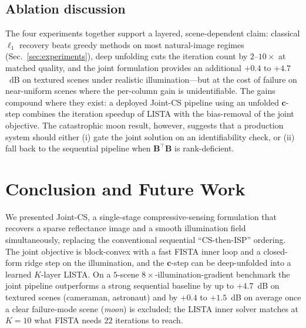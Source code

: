 \documentclass{article}
\begin{document}
\subsection{Ablation discussion}

The four experiments together support a layered, scene-dependent claim: classical $\ell_1$ recovery beats greedy methods on most natural-image regimes (Sec.~\ref{sec:experiments}), deep unfolding cuts the iteration count by $2$--$10\times$ at matched quality, and the joint formulation provides an additional $+0.4$ to $+4.7$~dB on textured scenes under realistic illumination---but at the cost of failure on near-uniform scenes where the per-column gain is unidentifiable. The gains compound where they exist: a deployed Joint-CS pipeline using an unfolded $\boldsymbol{c}$-step combines the iteration speedup of LISTA with the bias-removal of the joint objective. The catastrophic moon result, however, suggests that a production system should either (i) gate the joint solution on an identifiability check, or (ii) fall back to the sequential pipeline when $\boldsymbol{B}^\top \boldsymbol{B}$ is rank-deficient.


\section{Conclusion and Future Work}

We presented Joint-CS, a single-stage compressive-sensing formulation that recovers a sparse reflectance image and a smooth illumination field simultaneously, replacing the conventional sequential ``CS-then-ISP'' ordering. The joint objective is block-convex with a fast FISTA inner loop and a closed-form ridge step on the illumination, and the $\boldsymbol{c}$-step can be deep-unfolded into a learned $K$-layer LISTA. On a $5$-scene $8\times$-illumination-gradient benchmark the joint pipeline outperforms a strong sequential baseline by up to $+4.7$~dB on textured scenes (cameraman, astronaut) and by $+0.4$ to $+1.5$~dB on average once a clear failure-mode scene (\emph{moon}) is excluded; the LISTA inner solver matches at $K{=}10$ what FISTA needs $22$ iterations to reach.
\end{document}

